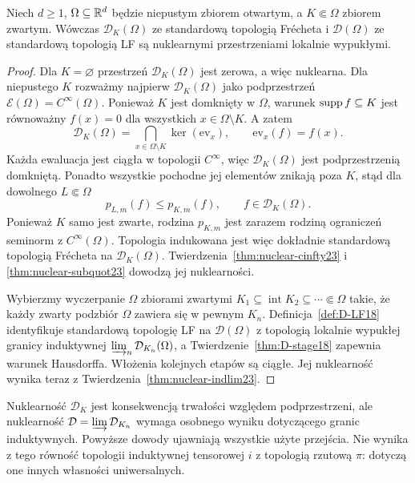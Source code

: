 \begin{twierdzenie}
\label{thm:nuclear-D23}
Niech $d\ge1$, $\Omega\subseteq\mathbb R^d$ będzie niepustym
zbiorem otwartym, a $K\Subset\Omega$ zbiorem zwartym.
Wówczas $\mathcal D_K(\Omega)$ ze standardową topologią
Frécheta i $\mathcal D(\Omega)$ ze standardową topologią
LF są nuklearnymi przestrzeniami lokalnie wypukłymi.
\end{twierdzenie}
\begin{proof}
Dla $K=\varnothing$ przestrzeń $\mathcal D_K(\Omega)$
jest zerowa, a więc nuklearna. Dla niepustego $K$
rozważmy najpierw $\mathcal D_K(\Omega)$ jako
podprzestrzeń $\mathcal E(\Omega)=C^\infty(\Omega)$.
Ponieważ $K$ jest domknięty w $\Omega$,
warunek $\operatorname{supp} f\subseteq K$ jest równoważny
$f(x)=0$ dla wszystkich $x\in\Omega\setminus K$.
A zatem
\[
 \mathcal D_K(\Omega)=
 \bigcap_{x\in\Omega\setminus K}\ker(\mathrm{ev}_x),
 \qquad \mathrm{ev}_x(f)=f(x).
\]
Każda ewaluacja jest ciągła w topologii $C^\infty$,
więc $\mathcal D_K(\Omega)$ jest podprzestrzenią
domkniętą. Ponadto wszystkie pochodne jej elementów
znikają poza $K$, stąd dla dowolnego $L\Subset\Omega$
\[
 p_{L,m}(f)\le p_{K,m}(f),\qquad
 f\in\mathcal D_K(\Omega).
\]
Ponieważ $K$ samo jest zwarte, rodzina $p_{K,m}$
jest zarazem rodziną ograniczeń seminorm z $C^\infty(\Omega)$.
Topologia indukowana jest więc dokładnie standardową
topologią Frécheta na $\mathcal D_K(\Omega)$.
Twierdzenia~\ref{thm:nuclear-cinfty23} i
\ref{thm:nuclear-subquot23} dowodzą jej nuklearności.

Wybierzmy wyczerpanie $\Omega$ zbiorami zwartymi
$K_1\subseteq\operatorname{int}K_2\subseteq\cdots\Subset\Omega$
takie, że każdy zwarty podzbiór $\Omega$ zawiera się
w pewnym $K_n$. Definicja~\ref{def:D-LF18} identyfikuje standardową
topologię LF na $\mathcal D(\Omega)$ z topologią
lokalnie wypukłej granicy induktywnej
$\varinjlim_n\mathcal D_{K_n}(\Omega)$, a
Twierdzenie~\ref{thm:D-stage18} zapewnia warunek Hausdorffa.
Włożenia kolejnych etapów są ciągłe.
Jej nuklearność wynika teraz z
Twierdzenia~\ref{thm:nuclear-indlim23}.
\end{proof}

\begin{uwaga}
\label{rem:nuclear-D-summary23}
Nuklearność $\mathcal D_K$ jest konsekwencją trwałości
względem podprzestrzeni, ale nuklearność
$\mathcal D=\varinjlim\mathcal D_{K_n}$ wymaga osobnego
wyniku dotyczącego granic induktywnych. Powyższe dowody
ujawniają wszystkie użyte przejścia. Nie wynika z tego
równość topologii induktywnej tensorowej $i$ z topologią
rzutową $\pi$: dotyczą one innych własności uniwersalnych.
\end{uwaga}

